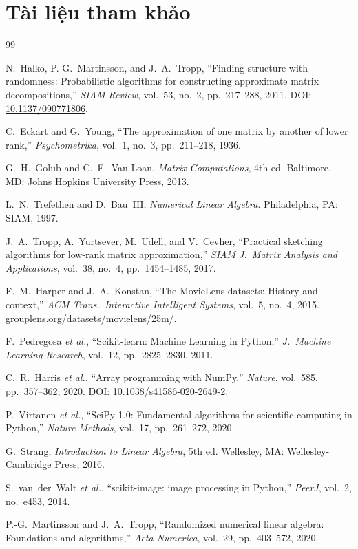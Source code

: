 \section*{Tài liệu tham khảo}\label{sec:references}

\begin{thebibliography}{99}

N.~Halko, P.-G.~Martinsson, and J.~A.~Tropp,
``Finding structure with randomness: Probabilistic algorithms for
constructing approximate matrix decompositions,''
\emph{SIAM Review}, vol.~53, no.~2, pp.~217--288, 2011.
DOI: \href{https://doi.org/10.1137/090771806}{10.1137/090771806}.

C.~Eckart and G.~Young,
``The approximation of one matrix by another of lower rank,''
\emph{Psychometrika}, vol.~1, no.~3, pp.~211--218, 1936.

G.~H.~Golub and C.~F.~Van Loan,
\emph{Matrix Computations}, 4th ed.
Baltimore, MD: Johns Hopkins University Press, 2013.

L.~N.~Trefethen and D.~Bau~III,
\emph{Numerical Linear Algebra}.
Philadelphia, PA: SIAM, 1997.

J.~A.~Tropp, A.~Yurtsever, M.~Udell, and V.~Cevher,
``Practical sketching algorithms for low-rank matrix approximation,''
\emph{SIAM J.\ Matrix Analysis and Applications}, vol.~38, no.~4,
pp.~1454--1485, 2017.

F.~M.~Harper and J.~A.~Konstan,
``The MovieLens datasets: History and context,''
\emph{ACM Trans.\ Interactive Intelligent Systems}, vol.~5, no.~4, 2015.
\href{https://grouplens.org/datasets/movielens/25m/}
     {grouplens.org/datasets/movielens/25m/}.

F.~Pedregosa \emph{et al.},
``Scikit-learn: Machine Learning in Python,''
\emph{J.\ Machine Learning Research}, vol.~12, pp.~2825--2830, 2011.

C.~R.~Harris \emph{et al.},
``Array programming with NumPy,''
\emph{Nature}, vol.~585, pp.~357--362, 2020.
DOI: \href{https://doi.org/10.1038/s41586-020-2649-2}
     {10.1038/s41586-020-2649-2}.

P.~Virtanen \emph{et al.},
``SciPy 1.0: Fundamental algorithms for scientific computing in Python,''
\emph{Nature Methods}, vol.~17, pp.~261--272, 2020.

G.~Strang,
\emph{Introduction to Linear Algebra}, 5th ed.
Wellesley, MA: Wellesley-Cambridge Press, 2016.

S.~van~der~Walt \emph{et al.},
``scikit-image: image processing in Python,''
\emph{PeerJ}, vol.~2, no.~e453, 2014.

P.-G.~Martinsson and J.~A.~Tropp,
``Randomized numerical linear algebra: Foundations and algorithms,''
\emph{Acta Numerica}, vol.~29, pp.~403--572, 2020.

\end{thebibliography}
